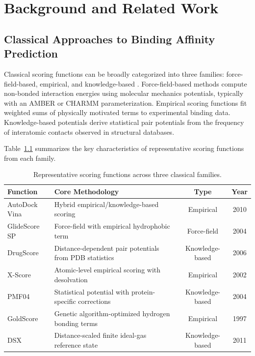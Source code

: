 \documentclass[12pt,oneside]{report}
\begin{document}
\chapter{Background and Related Work}
\section{Classical Approaches to Binding Affinity Prediction}

Classical scoring functions can be broadly categorized into three families: force-field-based, empirical, and knowledge-based \cite{Liu2018}. Force-field-based methods compute non-bonded interaction energies using molecular mechanics potentials, typically with an AMBER or CHARMM parameterization. Empirical scoring functions fit weighted sums of physically motivated terms to experimental binding data. Knowledge-based potentials derive statistical pair potentials from the frequency of interatomic contacts observed in structural databases.

Table~\ref{tab:scoring} summarizes the key characteristics of representative scoring functions from each family.

\begin{table}[htbp]
\centering
\caption{Representative scoring functions across three classical families.}\label{tab:scoring}
\singlespacing
\begin{tabularx}{\textwidth}{l>{\raggedright\arraybackslash}Xcc}
\toprule
\textbf{Function} & \textbf{Core Methodology} & \textbf{Type} & \textbf{Year} \\
\midrule
AutoDock Vina & Hybrid empirical/knowledge-based scoring & Empirical & 2010 \\
GlideScore SP & Force-field with empirical hydrophobic term & Force-field & 2004 \\
DrugScore & Distance-dependent pair potentials from PDB statistics & Knowledge-based & 2006 \\
X-Score & Atomic-level empirical scoring with desolvation & Empirical & 2002 \\
PMF04 & Statistical potential with protein-specific corrections & Knowledge-based & 2004 \\
GoldScore & Genetic algorithm-optimized hydrogen bonding terms & Empirical & 1997 \\
DSX & Distance-scaled finite ideal-gas reference state & Knowledge-based & 2011 \\
\bottomrule
\end{tabularx}
\end{table}
\end{document}
